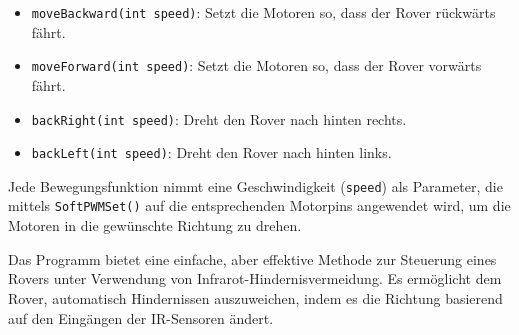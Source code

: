 \documentclass{vorlage-design-main}
\begin{document}
\begin{enumerate}
  \begin{itemize}
  
  \item
    \verb|moveBackward(int speed)|: Setzt die Motoren
    so, dass der Rover rückwärts fährt.
  \item
    \verb|moveForward(int speed)|: Setzt die Motoren
    so, dass der Rover vorwärts fährt.
  \item
    \verb|backRight(int speed)|: Dreht den Rover nach
    hinten rechts.
  \item
    \verb|backLeft(int speed)|: Dreht den Rover nach
    hinten links.
  \end{itemize}
\end{enumerate}

Jede Bewegungsfunktion nimmt eine Geschwindigkeit
(\verb|speed|) als Parameter, die mittels
\verb|SoftPWMSet()| auf die entsprechenden Motorpins
angewendet wird, um die Motoren in die gewünschte Richtung zu drehen.

Das Programm bietet eine einfache, aber effektive Methode zur Steuerung
eines Rovers unter Verwendung von Infrarot-Hindernisvermeidung. Es
ermöglicht dem Rover, automatisch Hindernissen auszuweichen, indem es
die Richtung basierend auf den Eingängen der IR-Sensoren ändert.
\end{document}
